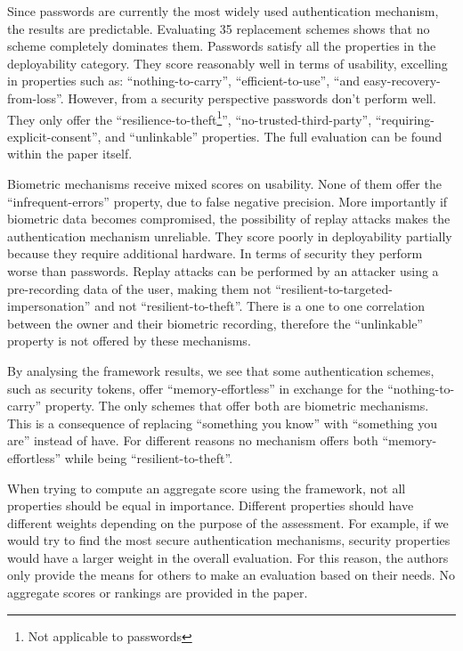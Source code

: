 Since passwords are currently the most widely used authentication mechanism, the results are predictable. Evaluating 35 replacement schemes shows that no scheme completely dominates them. Passwords satisfy all the properties in the deployability category. They score reasonably well in terms of usability, excelling in properties such as: ``nothing-to-carry'', ``efficient-to-use'', ``and easy-recovery-from-loss''. However, from a security perspective passwords don't perform well. They only offer the ``resilience-to-theft\footnote{Not applicable to passwords}'', ``no-trusted-third-party'', ``requiring-explicit-consent'', and ``unlinkable'' properties. The full evaluation can be found within the paper itself.

Biometric mechanisms receive mixed scores on usability. None of them offer the ``infrequent-errors'' property, due to false negative precision. More importantly if biometric data becomes compromised, the possibility of replay attacks makes the authentication mechanism unreliable. They score poorly in deployability partially because they require additional hardware. In terms of security they perform worse than passwords. Replay attacks can be performed by an attacker using a pre-recording data of the user, making them not ``resilient-to-targeted-impersonation'' and not ``resilient-to-theft''. There is a one to one correlation between the owner and their biometric recording, therefore the ``unlinkable'' property is not offered by these mechanisms. 

By analysing the framework results, we see that some authentication schemes, such as security tokens, offer ``memory-effortless'' in exchange for the ``nothing-to-carry'' property.  The only schemes that offer both are biometric mechanisms. This is a consequence of replacing ``something you know'' with ``something you are'' instead of have. For different reasons no mechanism offers both ``memory-effortless'' while being ``resilient-to-theft''.

When trying to compute an aggregate score using the framework, not all properties should be equal in importance. Different properties should have different weights depending on the purpose of the assessment. For example, if we would try to find the most secure authentication mechanisms, security properties would have a larger weight in the overall evaluation. For this reason, the authors only provide the means for others to make an evaluation based on their needs. No aggregate scores or rankings are provided in the paper. 


